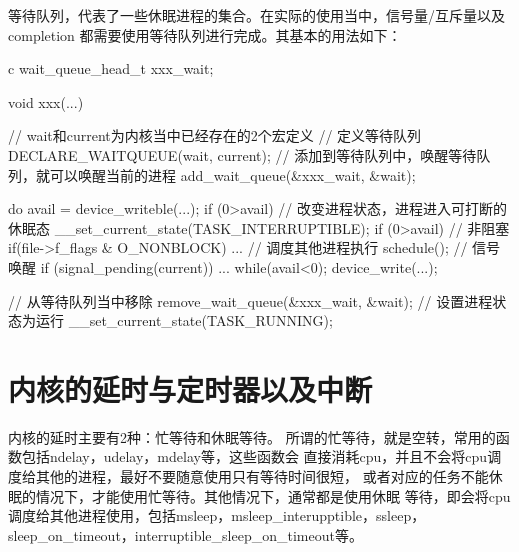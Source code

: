 等待队列，代表了一些休眠进程的集合。在实际的使用当中，信号量/互斥量以及completion
都需要使用等待队列进行完成。其基本的用法如下：
\begin{code-block}{c}
wait_queue_head_t xxx_wait;

void xxx(...)
{
        // wait和current为内核当中已经存在的2个宏定义
        // 定义等待队列
        DECLARE_WAITQUEUE(wait, current);
        // 添加到等待队列中，唤醒等待队列，就可以唤醒当前的进程
        add_wait_queue(&xxx_wait, &wait);

        do {
                avail = device_writeble(...);
                if (0>avail) {
                        // 改变进程状态，进程进入可打断的休眠态
                        __set_current_state(TASK_INTERRUPTIBLE);
                }
                if (0>avail) {
                        // 非阻塞
                        if(file->f_flags & O_NONBLOCK) {
                            ...
                        }
                        // 调度其他进程执行
                        schedule();
                        // 信号唤醒
                        if (signal_pending(current)) {
                            ...
                        }
                }
        } while(avail<0);
        device_write(...);

        // 从等待队列当中移除
        remove_wait_queue(&xxx_wait, &wait);
        // 设置进程状态为运行
        __set_current_state(TASK_RUNNING);
}
\end{code-block}

\section{内核的延时与定时器以及中断}
内核的延时主要有2种：忙等待和休眠等待。
所谓的忙等待，就是空转，常用的函数包括ndelay，udelay，mdelay等，这些函数会
直接消耗cpu，并且不会将cpu调度给其他的进程，最好不要随意使用只有等待时间很短，
或者对应的任务不能休眠的情况下，才能使用忙等待。其他情况下，通常都是使用休眠
等待，即会将cpu调度给其他进程使用，包括msleep，msleep\_interupptible，ssleep，
sleep\_on\_timeout，interruptible\_sleep\_on\_timeout等。

